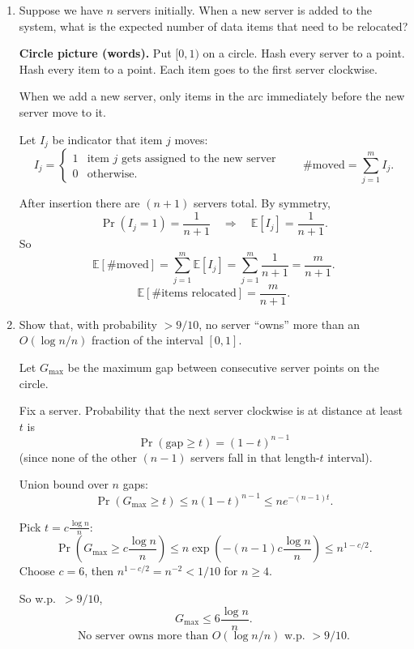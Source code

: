 \documentclass[10pt]{article}
\newcommand{\spara}[1]{\vspace{.5em}\noindent {\large\sffamily\textcolor{nyuOfficialPurple}{#1}}}
\newcommand{\E}{\mathbb{E}}
\begin{document}
\begin{enumerate}[label=\arabic*.]

\item Suppose we have $n$ servers initially. When a new server is added to the system, what is the expected number of data items that need to be relocated?

\spara{Pr. 3.1}

\textbf{Circle picture (words).}
Put $[0,1)$ on a circle. Hash every server to a point. Hash every item to a point.
Each item goes to the first server clockwise.

When we add a new server, only items in the arc immediately before the new server move to it.

Let $I_j$ be indicator that item $j$ moves:
\[
I_j =
\begin{cases}
1 & \text{item $j$ gets assigned to the new server}\\
0 & \text{otherwise.}
\end{cases}
\qquad
\#\text{moved}=\sum_{j=1}^m I_j.
\]

After insertion there are $(n+1)$ servers total. By symmetry,
\[
\Pr(I_j=1)=\frac{1}{n+1}
\quad\Rightarrow\quad
\E[I_j]=\frac{1}{n+1}.
\]
So
\[
\E[\#\text{moved}] = \sum_{j=1}^m \E[I_j]=\sum_{j=1}^m \frac{1}{n+1}=\frac{m}{n+1}.
\]
\[
\boxed{\E[\#\text{items relocated}] = \frac{m}{n+1}.}
\]


\item Show that, with probability $> 9/10$, no server ``owns'' more than an $O(\log n / n)$ fraction of the interval $[0,1]$.

\spara{Pr. 3.2}

Let $G_{\max}$ be the maximum gap between consecutive server points on the circle.

Fix a server. Probability that the next server clockwise is at distance at least $t$ is
\[
\Pr(\text{gap}\ge t)=(1-t)^{n-1}
\]
(since none of the other $(n-1)$ servers fall in that length-$t$ interval).

Union bound over $n$ gaps:
\[
\Pr(G_{\max}\ge t)\le n(1-t)^{n-1}\le n e^{-(n-1)t}.
\]

Pick $t=c\frac{\log n}{n}$:
\[
\Pr\!\left(G_{\max}\ge c\frac{\log n}{n}\right)
\le n\exp\!\left(-(n-1)c\frac{\log n}{n}\right)
\le n^{1-c/2}.
\]
Choose $c=6$, then $n^{1-c/2}=n^{-2}<1/10$ for $n\ge 4$.

So w.p.\ $>9/10$,
\[
G_{\max}\le 6\frac{\log n}{n}.
\]
\[
\boxed{\text{No server owns more than }O(\log n/n)\text{ w.p. } >9/10.}
\]



\end{enumerate}
\end{document}
